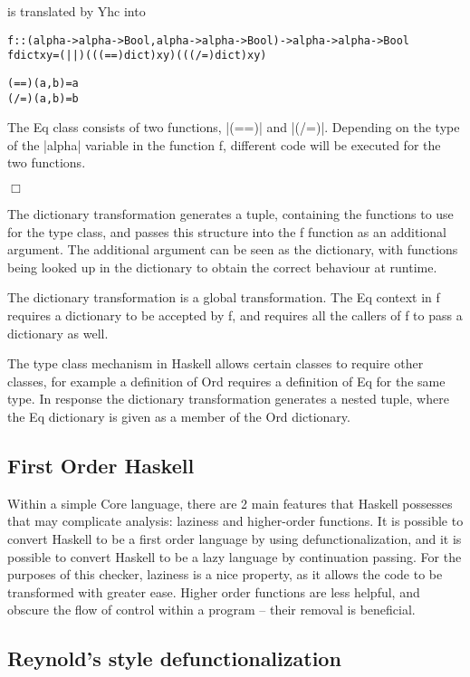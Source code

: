 \documentclass[preprint]{sigplanconf}
\newcommand{\C}[1]{\textsf{#1}}
\newcommand{\noexample}{\hfill$\Box$}
\newenvironment{code}{\begin{alltt}\small}{\end{alltt}}
\begin{document}
is translated by Yhc into

\begin{code}
f :: (alpha -> alpha -> Bool, alpha -> alpha -> Bool) -> alpha -> alpha -> Bool
f dict x y = (||) (((==) dict) x y) (((/=) dict) x y)

(==) (a,b) = a
(/=) (a,b) = b
\end{code}

The \C{Eq} class consists of two functions, |(==)| and |(/=)|. Depending on the type of the |alpha| variable in the function \C{f}, different code will be executed for the two functions.

\noexample

The dictionary transformation generates a tuple, containing the functions to use for the type class, and passes this structure into the \C{f} function as an additional argument. The additional argument can be seen as the dictionary, with functions being looked up in the dictionary to obtain the correct behaviour at runtime.

The dictionary transformation is a global transformation. The \C{Eq} context in \C{f} requires a dictionary to be accepted by \C{f}, and requires all the callers of \C{f} to pass a dictionary as well.

The type class mechanism in Haskell allows certain classes to require other classes, for example a definition of \C{Ord} requires a definition of \C{Eq} for the same type. In response the dictionary transformation generates a nested tuple, where the \C{Eq} dictionary is given as a member of the \C{Ord} dictionary.

\subsection{First Order Haskell}

Within a simple Core language, there are 2 main features that Haskell possesses that may complicate analysis: laziness and higher-order functions. It is possible to convert Haskell to be a first order language by using defunctionalization, and it is possible to convert Haskell to be a lazy language by continuation passing. For the purposes of this checker, laziness is a nice property, as it allows the code to be transformed with greater ease. Higher order functions are less helpful, and obscure the flow of control within a program -- their removal is beneficial.

\subsection{Reynold's style defunctionalization}
\end{document}
